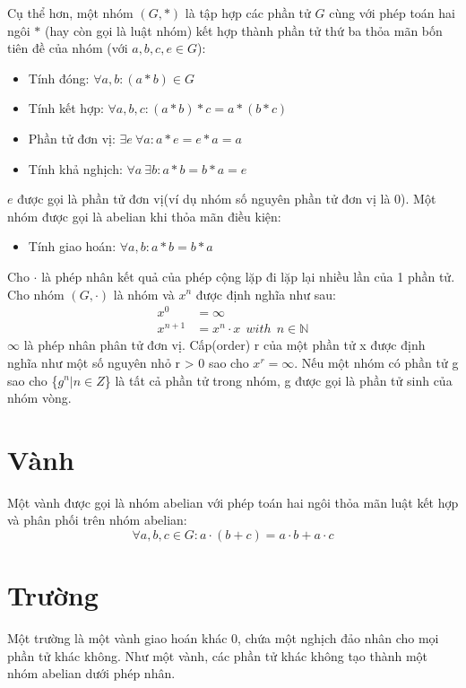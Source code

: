 \documentclass[a4paper,12pt]{report}
\begin{document}
Cụ thể hơn, một nhóm $(G, *)$ là tập hợp các phần tử $G$ cùng với phép toán hai ngôi $*$ (hay còn gọi là luật nhóm) kết hợp thành phần tử thứ ba thỏa mãn bốn tiên đề của nhóm (với $ a, b , c, e \in G$):
\begin{itemize}
\item Tính đóng: $\forall a, b: (a * b) \in G$
\item Tính kết hợp: $\forall a, b, c: (a * b) * c = a * (b * c)$
\item Phần tử đơn vị: $\exists e \ \forall a: a * e = e * a = a$
\item Tính khả nghịch: $\forall a \ \exists b: a * b = b * a = e$
\end{itemize}
$e$ được gọi là phần tử đơn vị(ví dụ nhóm số nguyên phần tử đơn vị là 0). Một nhóm được gọi là abelian  khi thỏa mãn điều kiện:
\begin{itemize}
\item Tính giao hoán: $\forall a,b: a * b = b * a$
\end{itemize}

Cho $\cdot$ là phép nhân kết quả của phép cộng lặp đi lặp lại nhiều lần của 1 phần tử. Cho nhóm $(G, \cdot)$ là nhóm và $x^n$ được định nghĩa như sau:
\begin{displaymath}
\begin{aligned}
x^0 & = \infty \\
x^{n + 1} & = x^n\cdot x \ \ with \ \ n \in \mathbb{N}
\end{aligned}
\end{displaymath}
$\infty$ là phép nhân phân tử đơn vị. Cấp(order) r của một phần tử x được định nghĩa như một số nguyên nhỏ r > 0 sao cho $x^r = \infty$. Nếu một nhóm có phần tử g sao cho \{$g^n | n \in Z$\} là tất cả phần tử trong nhóm, g được gọi là phần tử sinh của nhóm vòng.
\section{Vành}
Một vành được gọi là nhóm abelian  với phép toán hai ngôi thỏa mãn luật kết hợp và phân phối trên nhóm abelian:
\begin{displaymath}
\forall a, b, c \in G: a\cdot (b + c) = a \cdot b + a \cdot c
\end{displaymath}
\section{Trường}
Một trường là một vành giao hoán khác 0, chứa một nghịch đảo nhân cho mọi phần tử khác không. Như một vành, các phần tử khác không tạo thành một nhóm abelian dưới phép nhân.
\end{document}
